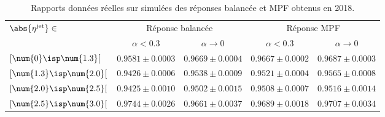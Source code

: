 \begin{table}[h]
\centering
\begin{tabular}{lcccc}
\toprule
\multirow{2}{*}{$\abs{\eta^\text{jet}}\in$} & \multicolumn{2}{c}{Réponse balancée} & \multicolumn{2}{c}{Réponse MPF} \\
\cmidrule(lr){2-3}\cmidrule(lr){4-5}
 & $\alpha<\num{0.3}$ & $\alpha\to0$ & $\alpha<\num{0.3}$ & $\alpha\to0$\\
\midrule
$[\num{0}\isp \num{1.3}[$ & $\num{0.9581}\pm\num{0.0003}$ & $\num{0.9669}\pm\num{0.0004}$ & $\num{0.9667}\pm\num{0.0002}$ & $\num{0.9687}\pm\num{0.0003}$ \\
$[\num{1.3}\isp \num{2.0}[$ & $\num{0.9426}\pm\num{0.0006}$ & $\num{0.9538}\pm\num{0.0009}$ & $\num{0.9521}\pm\num{0.0004}$ & $\num{0.9565}\pm\num{0.0008}$ \\
$[\num{2.0}\isp \num{2.5}[$ & $\num{0.9425}\pm\num{0.0010}$ & $\num{0.9502}\pm\num{0.0015}$ & $\num{0.9508}\pm\num{0.0007}$ & $\num{0.9516}\pm\num{0.0014}$ \\
$[\num{2.5}\isp \num{3.0}[$ & $\num{0.9744}\pm\num{0.0026}$ & $\num{0.9661}\pm\num{0.0037}$ & $\num{0.9689}\pm\num{0.0018}$ & $\num{0.9707}\pm\num{0.0034}$ \\
\bottomrule
\end{tabular}
\caption[Rapports des réponses balancée et MPF obtenus en 2018.]{Rapports données réelles sur simulées des réponses balancée et MPF obtenus en 2018.}
\label{tab-responses_recap_table_2018ABCD}
\end{table}